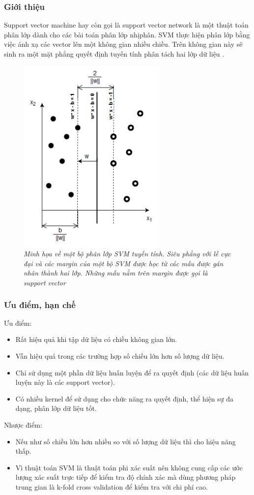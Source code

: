 \subsubsection{Giới thiệu}
Support vector machine hay còn gọi là support vector network là một thuật toán phân lớp dành cho các bài toán phân lớp nhịphân. SVM thực hiện phân lớp bằng việc ánh xạ các vector lên một không gian nhiều chiều. Trên không gian này sẽ sinh ra một mặt phẳng quyết định tuyến tính phân tách hai lớp dữ liệu \cite{Cortes1995}.
	\begin{figure}[ht]
    \centering
			\includegraphics[width=0.65\textwidth]{linearSVM.png}
      \caption{\textit{Minh họa về một bộ phân lớp SVM tuyến tính. Siêu phẳng với lề cực đại và các margin của một bộ SVM được học từ các mẫu được gán nhãn thành hai lớp. Những mẫu nằm trên margin được gọi là support vector}}
	\end{figure}
\subsubsection{Ưu điểm, hạn chế}
		Ưu điểm:
		\begin{itemize}
			\item Rất hiệu quả khi tập dữ liệu có chiều không gian lớn.
			\item Vẫn hiệu quá trong các trường hợp số chiều lớn hơn số lượng dữ liệu.
      \item Chỉ sử dụng một phần dữ liệu huấn luyện để ra quyết định (các dữ liệu huấn luyện này là các support vector).
      \item Có nhiều kernel để sử dụng cho chức năng ra quyết định, thể hiện sự đa dạng, phân lớp dữ liệu tốt.
		\end{itemize}
		Nhược điểm:
		\begin{itemize}
			\item Nếu như số chiều lớn hơn nhiều so với số lượng dữ liệu thì cho hiệu năng thấp.
			\item Vì thuật toán SVM là thuật toán phi xác suất nên không cung cấp các ước lượng xác suất trực tiếp để kiểm tra độ chính xác mà dùng phương pháp trung gian là k-fold cross validation để kiểm tra với chi phí cao.
		\end{itemize}
